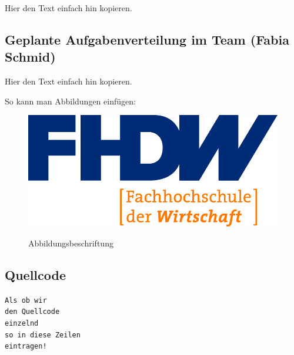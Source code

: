 Hier den Text einfach hin kopieren.

\subsection{Geplante Aufgabenverteilung im Team (Fabia Schmid)}

Hier den Text einfach hin kopieren.


So kann man Abbildungen einfügen:

\begin{figure}[hbt]
\centering
\begin{minipage}[t]{1\textwidth} %
\caption{Abbildungsbeschriftung} %
\includegraphics[width=1\textwidth]{img/fhdw}\\ %
\end{minipage}
\end{figure}

\subsection{Quellcode}

\texttt{Als ob wir}\\
\texttt{den Quellcode}\\
\texttt{einzelnd}\\
\texttt{so in diese Zeilen}\\
\texttt{eintragen!}\\
